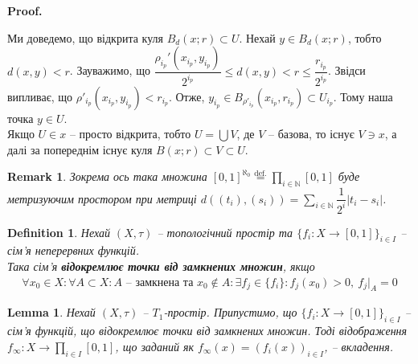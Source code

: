\documentclass[a4paper, 10pt]{article}
\makeatletter
\theoremstyle{theoremdd}
\newtheorem{definition}[theorem]{Definition}
\newtheorem{remark}[theorem]{Remark}
\newtheorem{lemma}[theorem]{Lemma}
\renewenvironment{proof}[1][Proof.\\]{\par
\pushQED{\hfill \qed}%
\normalfont \topsep6\p@\@plus6\p@\relax
\trivlist
\item\relax
{\bfseries
#1\@addpunct{.}}\hspace\labelsep\ignorespaces
}{%
\popQED\endtrivlist\@endpefalse
}
\makeatother
\begin{document}
\begin{proof}
Ми доведемо, що відкрита куля $B_d(x;r) \subset U$. Нехай $y \in B_d(x;r)$, тобто $d(x,y) < r$. Зауважимо, що $\dfrac{\rho_{i_p}'(x_{i_p},y_{i_p})}{2^{i_p}} \leq d(x,y) < r \leq \dfrac{r_{i_p}}{2^{i_p}}$. Звідси випливає, що $\rho'_{i_p}(x_{i_p},y_{i_p}) < r_{i_p}$. Отже, $y_{i_p} \in B_{\rho'_{i_p}}(x_{i_p},r_{i_p}) \subset U_{i_p}$. Тому наша точка $y \in U$.\\
Якщо $U \in x$ -- просто відкрита, тобто $U = \displaystyle\bigcup V$, де $V$ -- базова, то існує $V \ni x$, а далі за попереднім існує куля $B(x;r) \subset V \subset U$.
\end{proof}

\begin{remark}
Зокрема ось така множина $[0,1]^{\aleph_0} \overset{\text{def.}}{=} \displaystyle\prod_{i \in \mathbb{N}} [0,1]$ буде метризуючим простором при метриці $d((t_i),(s_i)) = \displaystyle\sum_{i \in \mathbb{N}} \dfrac{1}{2^i} |t_i - s_i|$.
\end{remark}

\begin{definition}
Нехай $(X,\tau)$ -- топологічний простір та $\{f_i \colon X \to [0,1] \}_{i \in I}$ -- сім'я неперервних функцій.\\
Така сім'я \textbf{відокремлює точки від замкнених множин}, якщо
\begin{align*}
\forall x_0 \in X: \forall A \subset X: \text{$A$ -- замкнена та $x_0 \notin A$}: \exists f_j \in \{f_i\}: f_j(x_0) > 0,\ f_j|_A = 0
\end{align*}
\end{definition}

\begin{lemma}
Нехай $(X,\tau)$ -- $T_1$-простір. Припустимо, що $\{f_i \colon X \to [0,1] \}_{i \in I}$ -- сім'я функцій, що відокремлює точки від замкнених множин. Тоді відображення $f_\infty \colon X \to \displaystyle\prod_{i \in I} [0,1]$, що заданий як $f_\infty(x) = (f_i(x))_{i \in I}$, -- вкладення.
\end{lemma}
\end{document}
